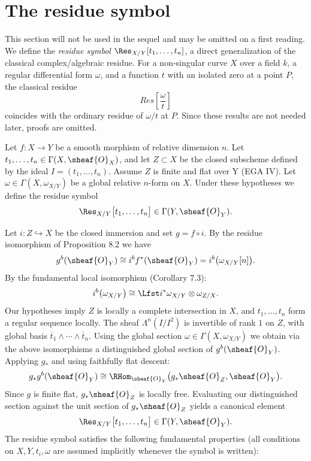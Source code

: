
\setcounter{page}{195}
\section{The residue symbol}

This section will not be used in the sequel and may be omitted on a first reading. We define the \textit{residue symbol} $\Res_{X/Y}[t_1,\dots,t_n]$, a direct generalization of the classical complex/algebraic residue. For a non-singular curve $X$ over a field $k$, a regular differential form $\omega$, and a function $t$ with an isolated zero at a point $P$, the classical residue
\[
Res\left[\dfrac{\omega}{t}\right]
\]
coincides with the ordinary residue of $\omega/t$ at $P$. Since these results are not needed later, proofs are omitted.

Let $f\colon X\to Y$ be a smooth morphism of relative dimension $n$. Let $t_1,\dots,t_n\in\Gamma(X,\sheaf{O}_X)$, and let $Z\subset X$ be the closed subscheme defined by the ideal $I=(t_1,\dots,t_n)$. Assume $Z$ is finite and flat over Y (EGA IV). Let $\omega\in\Gamma(X,\omega_{X/Y})$ be a global relative $n$-form on $X$. Under these hypotheses we define the residue symbol
\[
\Res_{X/Y}\bigl[t_1,\dots,t_n\bigr] \in \Gamma(Y,\sheaf{O}_Y).
\]

Let $i\colon Z\hookrightarrow X$ be the closed immersion and set $g = f\circ i$. By the residue isomorphism of Proposition 8.2 we have
\setcounter{page}{196}
\[
g^b(\sheaf{O}_Y) \cong i^b f^*(\sheaf{O}_Y)
= i^b\bigl(\omega_{X/Y}[n]\bigr).
\]
By the fundamental local isomorphism (Corollary 7.3):
\[
i^b\bigl(\omega_{X/Y}\bigr)
\cong \Lfst i^*\omega_{X/Y} \otimes \omega_{Z/X}.
\]
Our hypotheses imply $Z$ is locally a complete intersection in $X$, and $t_1,\dots,t_n$ form a regular sequence locally. The sheaf $\Lambda^n(I/I^2)$ is invertible of rank $1$ on $Z$, with global basis $\overline{t}_1\wedge\cdots\wedge\overline{t}_n$. Using the global section $\omega\in\Gamma(X,\omega_{X/Y})$ we obtain via the above isomorphisms a distinguished global section of $g^b(\sheaf{O}_Y)$. Applying $g_*$ and using faithfully flat descent:
\[
g_*g^b(\sheaf{O}_Y)
\cong \RHom_{\sheaf{O}_Y}\bigl(g_*\sheaf{O}_Z,\sheaf{O}_Y\bigr).
\]
Since $g$ is finite flat, $g_*\sheaf{O}_Z$ is locally free. Evaluating our distinguished section against the unit section of $g_*\sheaf{O}_Z$ yields a canonical element
\[
\Res_{X/Y}\bigl[t_1,\dots,t_n\bigr] \in \Gamma(Y,\sheaf{O}_Y).
\]
\setcounter{page}{197}
The residue symbol satisfies the following fundamental properties (all conditions on $X,Y,t_i,\omega$ are assumed implicitly whenever the symbol is written):

